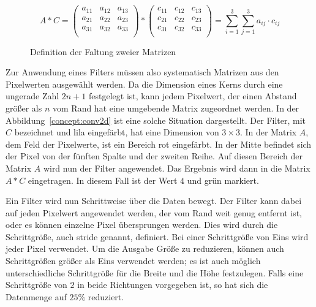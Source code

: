    
    \begin{figure}
        
        $$A \ast C 
        =
        \left(
        \begin{matrix}
            a_{11} & a_{12} & a_{13}\\
            a_{21} & a_{22} & a_{23}\\
            a_{31} & a_{32} & a_{33}\\
        \end{matrix}
        \right)
        \ast
        \left(
        \begin{matrix}
            c_{11} & c_{12} & c_{13}\\
            c_{21} & c_{22} & c_{23}\\
            c_{31} & c_{32} & c_{33}\\
        \end{matrix}
        \right)
        = 
        \sum_{i=1}^3\sum_{j=1}^3  a_{ij} \cdot c_{ij}
        $$
        
        \caption{Definition der Faltung zweier Matrizen}\label{concept:FaltungMatrix}
        
    \end{figure}
 
 Zur Anwendung eines Filters müssen also systematisch Matrizen aus den Pixelwerten ausgewählt werden. Da die Dimension eines Kerns durch eine ungerade Zahl $2n+1$ festgelegt ist, kann jedem Pixelwert, der einen Abstand größer als $n$ vom Rand hat eine umgebende Matrix zugeordnet werden. In der Abbildung~\ref{concept:conv2d} ist eine solche Situation dargestellt. Der Filter, mit $C$ bezeichnet und lila eingefärbt, hat eine Dimension von $3 \times 3$. In der Matrix $A$, dem Feld der Pixelwerte, ist ein Bereich rot eingefärbt. In der Mitte befindet sich der Pixel von der fünften Spalte und der zweiten Reihe. Auf diesen Bereich der Matrix $A$ wird nun der Filter angewendet. Das Ergebnis wird dann in die Matrix $A\ast C$ eingetragen. In diesem Fall ist der Wert $4$ und grün markiert.
 
  
 Ein Filter wird nun Schrittweise über die Daten bewegt.  Der Filter kann dabei auf jeden Pixelwert angewendet werden, der vom Rand weit genug entfernt ist, oder es können einzelne Pixel übersprungen werden. Dies wird durch die Schrittgröße, auch stride genannt, definiert. Bei einer Schrittgröße von Eins wird jeder Pixel verwendet. Um die Ausgabe Größe zu reduzieren, können auch Schrittgrößen größer als Eins verwendet werden; es ist auch möglich unterschiedliche Schrittgröße für die Breite und die Höhe festzulegen. Falls eine Schrittgröße von $2$ in beide Richtungen vorgegeben ist, so hat sich die Datenmenge auf $25\%$ reduziert. \cite{Dumoulin:2016}
 
